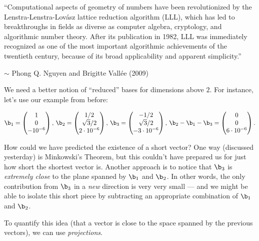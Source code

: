 
\begin{displayquote}
	``Computational aspects of geometry of numbers have been revolutionized by the 	Lenstra-Lenstra-Lov\'asz lattice reduction algorithm (LLL), which has led to breakthroughs in fields as diverse as computer algebra, cryptology, and algorithmic number theory. After its publication in 1982, LLL was immediately recognized as one of the most important algorithmic achievements of the twentieth century, because of its broad applicability and apparent simplicity.''
\end{displayquote}
\begin{flushright}\small
	$\sim$ Phong Q. Nguyen and Brigitte Vall\'ee (2009)
\end{flushright}

We need a better notion of ``reduced'' bases for dimensions above $2$. For instance, let's use our example from before:

\[\b_1=\begin{pmatrix}
1\\0\\-10^{-6}
\end{pmatrix},\,\b_2=\begin{pmatrix}
1/2 \\ \sqrt{3}/2 \\ 2\cdot 10^{-6}
\end{pmatrix},\,\b_3=\begin{pmatrix}
-1/2 \\ \sqrt{3}/2 \\ -3\cdot 10^{-6}
\end{pmatrix},\,\b_2-\b_1-\b_3=\begin{pmatrix}
0 \\ 0 \\ 6\cdot 10^{-6}
\end{pmatrix}.\]

How could we have predicted the existence of a short vector? One way (discussed yesterday) is Minkowski's Theorem, but this couldn't have prepared us for just how short the shortest vector is. Another approach is to notice that $\b_3$ is \emph{extremely close} to the plane spanned by $\b_1$ and $\b_2$. In other words, the only contribution from $\b_3$ in a \emph{new} direction is very very small --- and we might be able to isolate this short piece by subtracting an appropriate combination of $\b_1$ and $\b_2$. 

To quantify this idea (that a vector is close to the space spanned by the previous vectors), we can use \emph{projections}.

